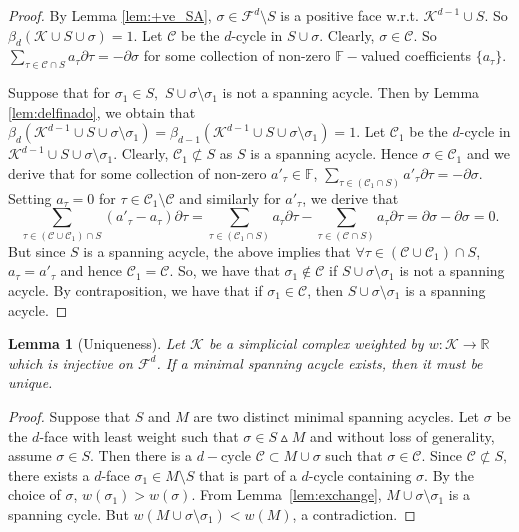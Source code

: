 \documentclass[12pt]{amsart}
\newtheorem{lemma}[theorem]{Lemma}
\numberwithin{equation}{section}
\numberwithin{theorem}{section}
\newcommand{\Real}{\mathbb R}
\newcommand{\1}{\mathbf{1}}
\def\sC{\mathscr{C}}
\def\F{\mathcal{F}}
\def\K{\mathcal{K}}
\def\bF{\mathbb{F}}
\begin{document}
\begin{proof}
By Lemma \ref{lem:+ve_SA}, $\sigma \in \F^d \setminus S$ is a positive face w.r.t. $\K^{d-1} \cup S$. So $\beta_d(\K \cup S \cup \sigma) = 1.$ Let $\sC$ be the $d$-cycle in $S \cup \sigma.$ Clearly, $\sigma \in \sC.$ So $\sum_{\tau \in \sC \cap S} a_{\tau}\partial \tau = - \partial \sigma$ for some collection of non-zero $\bF-$valued coefficients $\{a_{\tau}\}.$

Suppose that for $\sigma_1 \in S,$ $S \cup \sigma \setminus \sigma_1$ is not a spanning acycle. Then by Lemma \ref{lem:delfinado}, we obtain that $\beta_d(\K^{d-1} \cup S \cup {\sigma} \setminus \sigma_1) = \beta_{d-1}(\K^{d-1} \cup S \cup {\sigma} \setminus \sigma_1) = 1$. Let $\sC_1$ be the $d$-cycle in $\K^{d-1} \cup S \cup {\sigma} \setminus \sigma_1$.  Clearly, $\sC_1 \not\subset S$ as $S$ is a spanning acycle. Hence $\sigma
\in \sC_1$ and we derive that for some collection of non-zero $a'_{\tau} \in \mathbb{F}$, $\sum_{\tau \in (\sC_1 \cap
S)} a'_{\tau}\partial \tau  = -\partial \sigma$. Setting $a_{\tau} =0$ for $\tau \in \sC_1 \setminus \sC$ and similarly for
$a'_{\tau}$, we derive that
%
$$ \sum_{\tau \in (\sC
\cup \sC_1) \cap S} (a'_{\tau} - a_{\tau}) \partial \tau = \sum_{\tau \in (\sC_1 \cap S)} a_{\tau}\partial \tau - \sum_{\tau \in (\sC \cap S)} a_{\tau}\partial \tau  = \partial \sigma  - \partial \sigma = 0.$$
%
But since $S$ is a spanning acycle, the above implies that $\forall \tau \in (\sC \cup \sC_1) \cap S$, $a_{\tau} =
a'_{\tau}$ and hence $\sC_1 = \sC$. So, we have that $\sigma_1 \notin \sC$ if $S \cup \sigma \setminus \sigma_1$ is not a spanning acycle. By contraposition, we have that if $\sigma_1 \in \sC$, then $S \cup \sigma \setminus
\sigma_1$ is a spanning acycle.
%
\end{proof}
%
\begin{lemma}[Uniqueness]
\label{lem:uniqueness}
Let $\K$ be a simplicial complex weighted by $w: \K \to \Real$ which is injective on $\F^d$. If a minimal spanning acycle exists, then it must be unique.
\end{lemma}
%
\begin{proof}
Suppose that $S$ and $M$ are two distinct minimal spanning acycles. Let $\sigma$ be the $d$-face with least weight such that $\sigma \in S \vartriangle M$ and without loss of generality, assume $\sigma \in S$. Then there is a $d-$cycle $\sC \subset M \cup \sigma$ such that $\sigma \in \sC.$ Since $\sC \not\subset S,$  there exists a $d$-face $\sigma_1 \in M \setminus S$ that is part of a $d$-cycle containing $\sigma$. By the choice of $\sigma$, $w(\sigma_1) > w(\sigma).$ From Lemma~\ref{lem:exchange}, $M \cup \sigma \setminus \sigma_1$ is a spanning cycle. But $w(M \cup \sigma \setminus \sigma_1) < w(M)$, a contradiction.
\end{proof}
%
\end{document}
